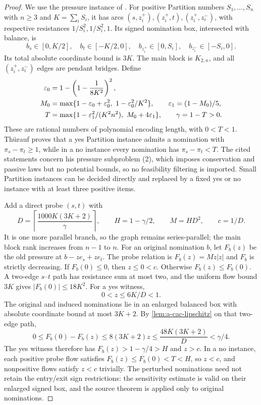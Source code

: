 \begin{proof}
We use the pressure instance of
\citet[Figure 2, equation (3), and Lemmas 4.3 and 4.17]{thurauf2022-deciding-the-feasibility-of-a}.
For positive Partition numbers $S_1,\ldots,S_n$ with $n\ge3$ and
$K=\sum_iS_i$, it has arcs $(s,z_i^+),(z_i^+,t),(z_i^+,z_i^-)$,
with respective resistances $1/S_i^2,1/S_i^2,1$. Its signed nomination
box, intersected with balance, is
\[
 b_s\in[0,K/2],\quad b_t\in[-K/2,0],\quad
 b_{z_i^+}\in[0,S_i],\quad b_{z_i^-}\in[-S_i,0].
\]
Its total absolute coordinate bound is $3K$. The main block is
$K_{2,n}$, and all $(z_i^+,z_i^-)$ edges are pendant bridges. Define
\begin{align*}
 \varepsilon_0&=1-\left(1-\frac1{8K^2}\right)^2,\\
 M_0&=\max\{1-\varepsilon_0+\varepsilon_0^2,\ 1-\varepsilon_0^2/K^2\},\qquad
 \varepsilon_1=(1-M_0)/5,\\
 T&=\max\{1-\varepsilon_1^2/(K^2n^2),\ M_0+4\varepsilon_1\},
 \qquad \gamma=1-T>0.
\end{align*}
These are rational numbers of polynomial encoding length, with
$0<T<1$. Th\"urauf proves that a yes Partition instance admits a
nomination with $\pi_s-\pi_t\ge1$, while in a no instance every
nomination has $\pi_s-\pi_t<T$. The cited statements concern his
pressure subproblem (2), which imposes conservation and passive laws
but no potential bounds, so no feasibility filtering is imported.
Small Partition instances can be decided directly and replaced by a
fixed yes or no instance with at least three positive items.

Add a direct probe $(s,t)$ with
\[
 D=\left\lceil\frac{1000K(3K+2)}{\gamma}\right\rceil,
 \qquad H=1-\gamma/2,\qquad M=HD^2,\qquad c=1/D.
\]
It is one more parallel branch, so the graph remains series-parallel;
the main block rank increases from $n-1$ to $n$. For an original
nomination $b$, let $F_b(z)$ be the old pressure at
$b-z e_s+z e_t$. The probe relation is $F_b(z)=Mz|z|$ and $F_b$ is
strictly decreasing. If $F_b(0)\le0$, then $z\le0<c$. Otherwise
$F_b(z)\le F_b(0)$. A two-edge $s$--$t$ path has resistance sum at most
two, and the uniform flow bound $3K$ gives
$|F_b(0)|\le18K^2$. For a yes witness,
\[
 0<z\le6K/D<1.
\]
The original and induced nominations lie in an enlarged balanced box
with absolute coordinate bound at most $3K+2$. By
\cref{lem:a-cac-lipschitz} on that two-edge path,
\[
 0\le F_b(0)-F_b(z)\le8(3K+2)z
 \le\frac{48K(3K+2)}D<\gamma/4.
\]
The yes witness therefore has $F_b(z)>1-\gamma/4>H$ and $z>c$.
In a no instance, each positive probe flow satisfies
$F_b(z)\le F_b(0)<T<H$, so $z<c$, and nonpositive flows satisfy $z<c$
trivially. The perturbed nominations need not retain the entry/exit
sign restrictions: the sensitivity estimate is valid on their enlarged
signed box, and the source theorem is applied only to original
nominations.


\end{proof}
